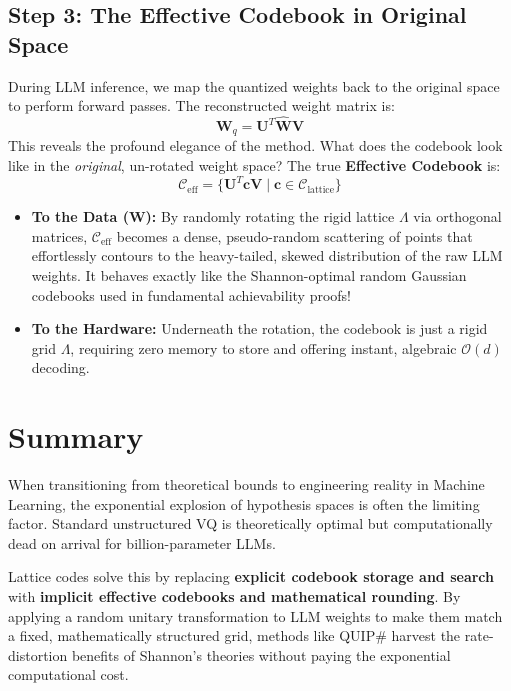 \documentclass[11pt]{article}
\begin{document}
\subsection{Step 3: The Effective Codebook in Original Space}
During LLM inference, we map the quantized weights back to the original space to perform forward passes. The reconstructed weight matrix is:
\begin{equation}
    \mathbf{W}_q = \mathbf{U}^T \widehat{\mathbf{W}} \mathbf{V}
\end{equation}
This reveals the profound elegance of the method. What does the codebook look like in the \textit{original}, un-rotated weight space? The true \textbf{Effective Codebook} is:
\begin{equation}
    \mathcal{C}_{\text{eff}} = \{ \mathbf{U}^T \mathbf{c} \mathbf{V} \mid \mathbf{c} \in \mathcal{C}_{\text{lattice}} \}
\end{equation}

\begin{tcolorbox}[colback=blue!5!white,colframe=blue!75!black,title=The Genius of the Effective Codebook]
\begin{itemize}
    \item \textbf{To the Data ($\mathbf{W}$):} By randomly rotating the rigid lattice $\Lambda$ via orthogonal matrices, $\mathcal{C}_{\text{eff}}$ becomes a dense, pseudo-random scattering of points that effortlessly contours to the heavy-tailed, skewed distribution of the raw LLM weights. It behaves exactly like the Shannon-optimal random Gaussian codebooks used in fundamental achievability proofs!
    \item \textbf{To the Hardware:} Underneath the rotation, the codebook is just a rigid grid $\Lambda$, requiring zero memory to store and offering instant, algebraic $\mathcal{O}(d)$ decoding.
\end{itemize}
\end{tcolorbox}

\section{Summary}

When transitioning from theoretical bounds to engineering reality in Machine Learning, the exponential explosion of hypothesis spaces is often the limiting factor. Standard unstructured VQ is theoretically optimal but computationally dead on arrival for billion-parameter LLMs. 

Lattice codes solve this by replacing \textbf{explicit codebook storage and search} with \textbf{implicit effective codebooks and mathematical rounding}. By applying a random unitary transformation to LLM weights to make them match a fixed, mathematically structured grid, methods like QUIP\# harvest the rate-distortion benefits of Shannon's theories without paying the exponential computational cost.
\end{document}
